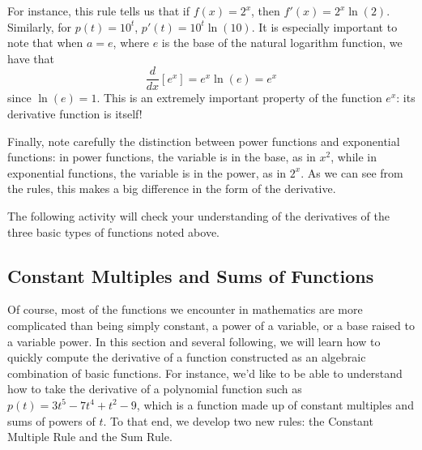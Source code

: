 

For instance, this rule tells us that if $f(x) = 2^x$, then $f'(x) = 2^x \ln(2)$.  Similarly, for $p(t) = 10^t$, $p'(t) = 10^t \ln(10)$.  It is especially important to note that when $a = e$, where $e$ is the base of the natural logarithm function, we have that 
$$\frac{d}{dx} [e^x] = e^x \ln(e) = e^x$$
since $\ln(e) = 1$.  This is an extremely important property of the function $e^x$:  its derivative function is itself!


Finally, note carefully the distinction between power functions  and exponential functions:  in power functions, the variable is in the base, as in $x^2$, while in exponential functions, the variable is in the power, as in $2^x$.  As we can see from the rules, this makes a big difference in the form of the derivative.

The following activity will check your understanding of the derivatives of the three basic types of functions noted above.


\subsection*{Constant Multiples and Sums of Functions}

Of course, most of the functions we encounter in mathematics are more complicated than being simply constant, a power of a variable, or a base raised to a variable power.  In this section and several following, we will learn how to quickly compute the derivative of a function constructed as an algebraic combination of basic functions.  For instance, we'd like to be able to understand how to take the derivative of a polynomial function such as $p(t) = 3t^5 - 7t^4 + t^2 - 9$, which is a function made up of constant multiples and sums of powers of $t$.  To that end, we develop two new rules:  the Constant Multiple Rule and the Sum Rule.

